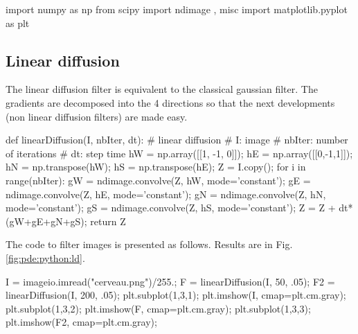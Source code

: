 \def\QRCODE{TB_IPR_TUT.IMG.pde_pythonqrcode.png}
\def\QRPAGE{http://www.iptutorials.science/tree/master/TB_IPR/TUT.IMG.pde/python}


\vspace*{-8pt}


\begin{python}
import numpy as np
from scipy import ndimage , misc
import matplotlib.pyplot as plt
\end{python}

\vspace*{-12pt}

\subsection{Linear diffusion}\vspace*{-6pt}
The linear diffusion filter is equivalent to the classical gaussian filter. The gradients are decomposed into the 4 directions so that the next developments (non linear diffusion filters) are made easy.
\begin{python}
def linearDiffusion(I, nbIter, dt):
    # linear diffusion  # I: image  # nbIter: number of iterations  # dt: step time
    hW = np.array([[1, -1, 0]]);
    hE = np.array([[0,-1,1]]);
    hN = np.transpose(hW);
    hS = np.transpose(hE);
    Z = I.copy();
    for i in range(nbIter):
        gW = ndimage.convolve(Z, hW, mode='constant');
        gE = ndimage.convolve(Z, hE, mode='constant');
        gN = ndimage.convolve(Z, hN, mode='constant');
        gS = ndimage.convolve(Z, hS, mode='constant');
        Z = Z + dt*(gW+gE+gN+gS);
    return Z
\end{python}

\vspace*{-3pt}

The code to filter images is presented as follows. Results are in Fig. \ref{fig:pde:python:ld}.

\vspace*{-3pt}
\begin{python}  
I = imageio.imread("cerveau.png")/255.;
F = linearDiffusion(I, 50, .05);
F2 = linearDiffusion(I, 200, .05);
plt.subplot(1,3,1);
plt.imshow(I, cmap=plt.cm.gray);
plt.subplot(1,3,2);
plt.imshow(F, cmap=plt.cm.gray);
plt.subplot(1,3,3);
plt.imshow(F2, cmap=plt.cm.gray);
\end{python}

\vspace*{-13pt}%

